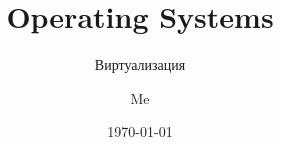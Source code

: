 \documentclass[12pt]{beamer}
\title{Operating Systems}
\subtitle{Виртуализация}
\author{Me}
\date{\today}
\begin{document}
  \begin{frame}
    \titlepage
  \end{frame}

  
  
  
  
  
  
  

%    
\end{document}
